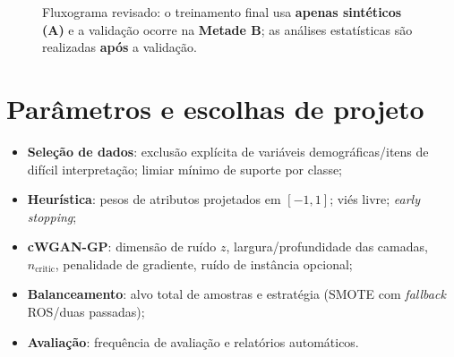\documentclass[12pt,a4paper]{article}
\begin{document}
\begin{figure}[h!]
\caption{Fluxograma revisado: o treinamento final usa \textbf{apenas sintéticos (A)} e a validação ocorre na \textbf{Metade B}; as análises estatísticas são realizadas \textbf{após} a validação.}
\end{figure}

\section{Parâmetros e escolhas de projeto}
\begin{itemize}[leftmargin=1.5em]
    \item \textbf{Seleção de dados}: exclusão explícita de variáveis demográficas/itens de difícil interpretação; limiar mínimo de suporte por classe;
    \item \textbf{Heurística}: pesos de atributos projetados em $[-1,1]$; viés livre; \emph{early stopping};
    \item \textbf{cWGAN-GP}: dimensão de ruído $z$, largura/profundidade das camadas, $n_{\text{critic}}$, penalidade de gradiente, ruído de instância opcional;
    \item \textbf{Balanceamento}: alvo total de amostras e estratégia (SMOTE com \emph{fallback} ROS/duas passadas);
    \item \textbf{Avaliação}: frequência de avaliação e relatórios automáticos.
\end{itemize}
\end{document}
